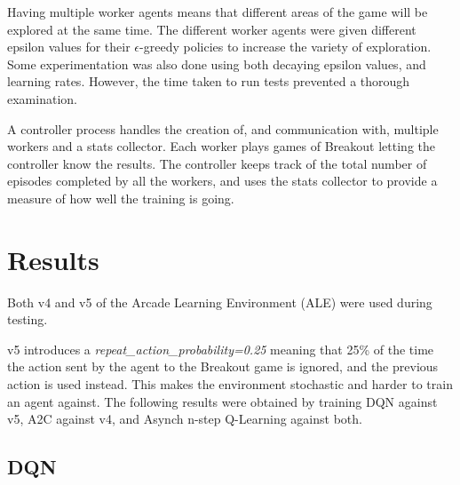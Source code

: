 \documentclass{article}
\begin{document}
Having multiple worker agents means that different areas of the game will be explored at the same time.
The different worker agents were given different epsilon values for their $\epsilon$-greedy policies to increase the variety of exploration.
Some experimentation was also done using both decaying epsilon values, and learning rates. However, the time taken to run tests prevented a thorough examination.

A controller process handles the creation of, and communication with, multiple workers and a stats collector.
Each worker plays games of Breakout letting the controller know the results.
The controller keeps track of the total number of episodes completed by all the workers, and uses the stats collector to provide a measure of how well the training is going.

\section{Results}

Both v4 and v5 of the Arcade Learning Environment (ALE) were used during testing. 

v5 introduces a \emph{repeat\_action\_probability=0.25} meaning that 25\% of the time the action sent by the agent to the Breakout game is ignored, and the previous action is used instead. This makes the environment stochastic and harder to train an agent against. The following results were obtained by training DQN against v5, A2C against v4, and Asynch n-step Q-Learning against both.


\subsection{DQN}
\end{document}
